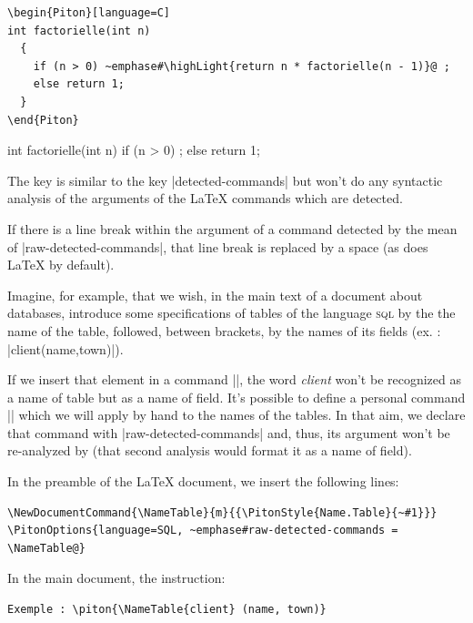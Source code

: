 \documentclass{article}
\begin{document}
\begin{Verbatim}
\begin{Piton}[language=C]
int factorielle(int n)
  {
    if (n > 0) ~emphase#\highLight{return n * factorielle(n - 1)}@ ;
    else return 1;
  }
\end{Piton}
\end{Verbatim}

\begin{Piton}[language=C]
int factorielle(int n)
  {
    if (n > 0)  ;
    else return 1;
  }
\end{Piton}

\bigskip
The key  is similar to the key
|detected-commands| but  won't do any syntactic analysis of the
arguments of the LaTeX commands which are detected.

If there is a line break within the argument of a command detected by the mean
of |raw-detected-commands|, that line break is replaced by a space (as does
LaTeX by default).

\medskip
Imagine, for example, that we wish, in the main text of a document about
databases, introduce some specifications of tables of the language
\textsc{sql} by the the name of the table, followed, between brackets, by the
names of its fields (ex. : |client(name,town)|).

If we insert that element in a command |\piton|, the word \emph{client} won't
be recognized as a name of table but as a name of field. It's possible to
define a personal command |\NomTable| which we will apply by hand to the names
of the tables. In that aim, we declare that command with
|raw-detected-commands| and, thus, its argument won't be re-analyzed by
 (that second analysis would format it as a name of field).

\medskip
In the preamble of the LaTeX document, we insert the following lines:

\begin{Verbatim}
\NewDocumentCommand{\NameTable}{m}{{\PitonStyle{Name.Table}{~#1}}}
\PitonOptions{language=SQL, ~emphase#raw-detected-commands = \NameTable@}
\end{Verbatim}

In the main document, the instruction:

\begin{Verbatim}
Exemple : \piton{\NameTable{client} (name, town)}
\end{Verbatim}
\end{document}
